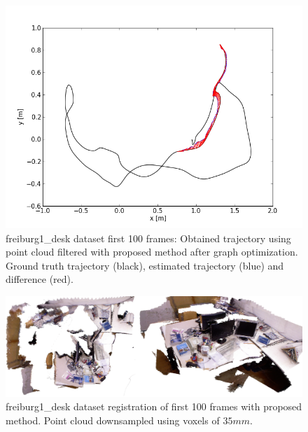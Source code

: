 \begin{figure}[H]
\begin{center}
\includegraphics[scale=0.75]{images/freiburg1_desk_1_100_optimized.png}
\caption{freiburg1\_desk dataset first 100 frames: Obtained trajectory using point cloud filtered with proposed method after graph optimization. Ground truth trajectory (black), estimated trajectory (blue) and difference (red).}
\label{fig:jan}
\end{center}
\end{figure}

\begin{figure}[H]
\begin{center}
\includegraphics[scale=0.2]{images/freiburg1_desk.png}
\caption{freiburg1\_desk dataset registration of first 100 frames with proposed method. Point cloud downsampled using voxels of $35mm$.}
\label{fig:jan}
\end{center}
\end{figure}


